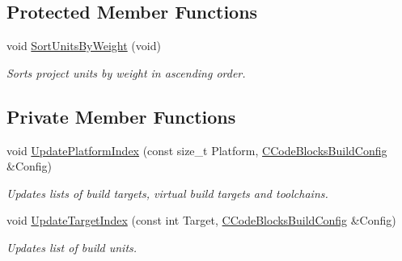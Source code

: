 \subsection*{Protected Member Functions}
\begin{DoxyCompactItemize}
\item 
void \hyperlink{classCCodeBlocksProject_a276e2738b070a798ed2503612f077c48}{Sort\-Units\-By\-Weight} (void)
\begin{DoxyCompactList}\small\item\em Sorts project units by weight in ascending order. \end{DoxyCompactList}\end{DoxyCompactItemize}
\subsection*{Private Member Functions}
\begin{DoxyCompactItemize}
\item 
void \hyperlink{classCCodeBlocksProject_a0456bbc2433f541b3409aa0722c9e19c}{Update\-Platform\-Index} (const size\-\_\-t Platform, \hyperlink{classCCodeBlocksBuildConfig}{C\-Code\-Blocks\-Build\-Config} \&Config)
\begin{DoxyCompactList}\small\item\em Updates lists of build targets, virtual build targets and toolchains. \end{DoxyCompactList}\item 
void \hyperlink{classCCodeBlocksProject_a78eda21e8436e55c5a36deb6519378eb}{Update\-Target\-Index} (const int Target, \hyperlink{classCCodeBlocksBuildConfig}{C\-Code\-Blocks\-Build\-Config} \&Config)
\begin{DoxyCompactList}\small\item\em Updates list of build units. \end{DoxyCompactList}\end{DoxyCompactItemize}
